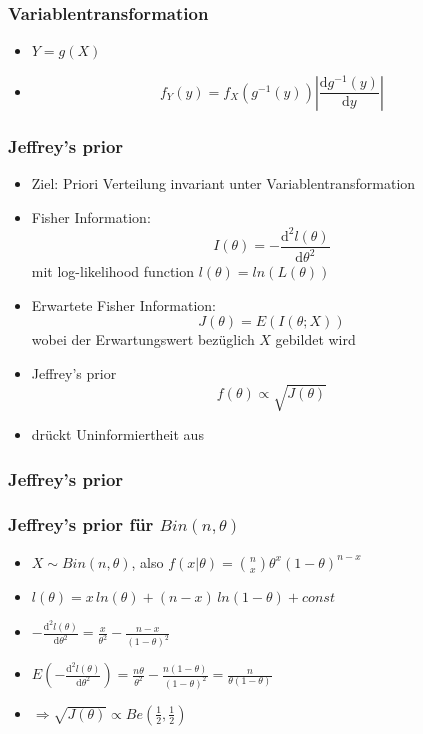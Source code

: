 \documentclass[aspectratio=169,xcolor=dvipsnames]{beamer}
\newtheorem{satz}{Satz}
\begin{document}
\begin{frame}
\frametitle{Variablentransformation}
\begin{itemize}
\item $Y=g(X)$
\item $$f_Y(y)=f_X(g^{-1}(y))\left|\frac{\text{d}g^{-1}(y)}{\text{d}y}\right|$$
\end{itemize}
\end{frame}

\begin{frame}
\frametitle{Jeffrey's prior}
\begin{itemize}
\item<1-> Ziel: Priori Verteilung invariant unter Variablentransformation
\item<2-> Fisher Information: $$I(\theta)=-\frac{\text{d}^2l(\theta)}{\text{d}\theta^2}$$
mit log-likelihood function $l(\theta)=ln(L(\theta))$
\item<3-> Erwartete Fisher Information: $$J(\theta)=E(I(\theta;X))$$
wobei der Erwartungswert bezüglich $X$ gebildet wird
\item<4-> Jeffrey's prior $$f(\theta)\propto\sqrt{J(\theta)}$$
\item<5-> drückt Uninformiertheit aus
\end{itemize}
\end{frame}

\begin{frame}
\frametitle{Jeffrey's prior}
\end{frame}

\begin{frame}
\frametitle{Jeffrey's prior für $Bin(n,\theta)$}
\begin{itemize}
\item<1-> $X\sim Bin(n,\theta)$, also $f(x|\theta)= \binom{n}{x}\theta^x(1-\theta)^{n-x}$
\item<2-> $l(\theta)=x\,ln(\theta)+(n-x)\,ln(1-\theta)+const$
\item<3-> $-\frac{\text{d}^2l(\theta)}{\text{d}\theta^2}=\frac{x}{\theta^2}-\frac{n-x}{(1-\theta)^2}$ 
\item<4-> $E(-\frac{\text{d}^2l(\theta)}{\text{d}\theta^2}) = \frac{n\theta}{\theta^2}-\frac{n(1-\theta)}{(1-\theta)^2}=\frac{n}{\theta(1-\theta)}$
\item<5-> $\Rightarrow \sqrt{J(\theta)}\propto Be(\frac{1}{2},\frac{1}{2})$
\end{itemize}
\end{frame}
\end{document}
